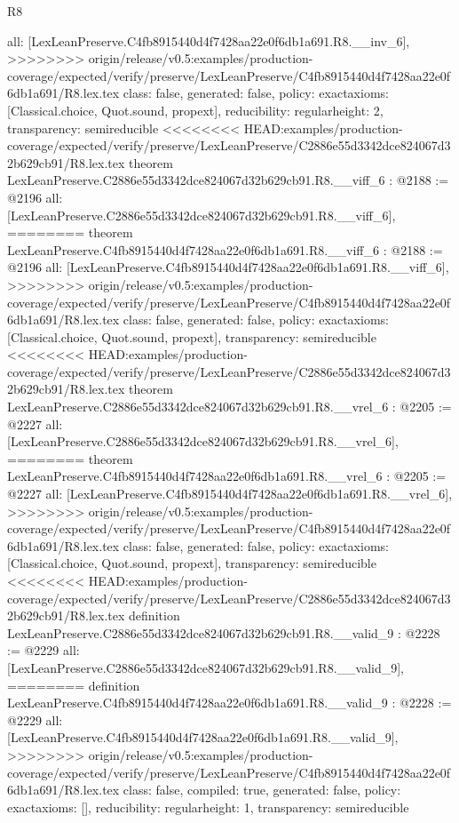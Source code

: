 \begin{lexlean}{R8}
\begin{coremodule}
{{{{{{{{{{{{  all: [LexLeanPreserve.C4fb8915440d4f7428aa22e0f6db1a691.R8.__inv_6],
>>>>>>>> origin/release/v0.5:examples/production-coverage/expected/verify/preserve/LexLeanPreserve/C4fb8915440d4f7428aa22e0f6db1a691/R8.lex.tex
  class: false,
  generated: false,
  policy: exact{axioms: [Classical.choice, Quot.sound, propext]},
  reducibility: regular{height: 2},
  transparency: semireducible
}
<<<<<<<< HEAD:examples/production-coverage/expected/verify/preserve/LexLeanPreserve/C2886e55d3342dce824067d32b629cb91/R8.lex.tex
theorem LexLeanPreserve.C2886e55d3342dce824067d32b629cb91.R8.__viff_6 : @2188 := @2196 {
  all: [LexLeanPreserve.C2886e55d3342dce824067d32b629cb91.R8.__viff_6],
========
theorem LexLeanPreserve.C4fb8915440d4f7428aa22e0f6db1a691.R8.__viff_6 : @2188 := @2196 {
  all: [LexLeanPreserve.C4fb8915440d4f7428aa22e0f6db1a691.R8.__viff_6],
>>>>>>>> origin/release/v0.5:examples/production-coverage/expected/verify/preserve/LexLeanPreserve/C4fb8915440d4f7428aa22e0f6db1a691/R8.lex.tex
  class: false,
  generated: false,
  policy: exact{axioms: [Classical.choice, Quot.sound, propext]},
  transparency: semireducible
}
<<<<<<<< HEAD:examples/production-coverage/expected/verify/preserve/LexLeanPreserve/C2886e55d3342dce824067d32b629cb91/R8.lex.tex
theorem LexLeanPreserve.C2886e55d3342dce824067d32b629cb91.R8.__vrel_6 : @2205 := @2227 {
  all: [LexLeanPreserve.C2886e55d3342dce824067d32b629cb91.R8.__vrel_6],
========
theorem LexLeanPreserve.C4fb8915440d4f7428aa22e0f6db1a691.R8.__vrel_6 : @2205 := @2227 {
  all: [LexLeanPreserve.C4fb8915440d4f7428aa22e0f6db1a691.R8.__vrel_6],
>>>>>>>> origin/release/v0.5:examples/production-coverage/expected/verify/preserve/LexLeanPreserve/C4fb8915440d4f7428aa22e0f6db1a691/R8.lex.tex
  class: false,
  generated: false,
  policy: exact{axioms: [Classical.choice, Quot.sound, propext]},
  transparency: semireducible
}
<<<<<<<< HEAD:examples/production-coverage/expected/verify/preserve/LexLeanPreserve/C2886e55d3342dce824067d32b629cb91/R8.lex.tex
definition LexLeanPreserve.C2886e55d3342dce824067d32b629cb91.R8.__valid_9 : @2228 := @2229 {
  all: [LexLeanPreserve.C2886e55d3342dce824067d32b629cb91.R8.__valid_9],
========
definition LexLeanPreserve.C4fb8915440d4f7428aa22e0f6db1a691.R8.__valid_9 : @2228 := @2229 {
  all: [LexLeanPreserve.C4fb8915440d4f7428aa22e0f6db1a691.R8.__valid_9],
>>>>>>>> origin/release/v0.5:examples/production-coverage/expected/verify/preserve/LexLeanPreserve/C4fb8915440d4f7428aa22e0f6db1a691/R8.lex.tex
  class: false,
  compiled: true,
  generated: false,
  policy: exact{axioms: []},
  reducibility: regular{height: 1},
  transparency: semireducible
}}}}}}}}}}}}}}}
\end{coremodule}
\end{lexlean}
